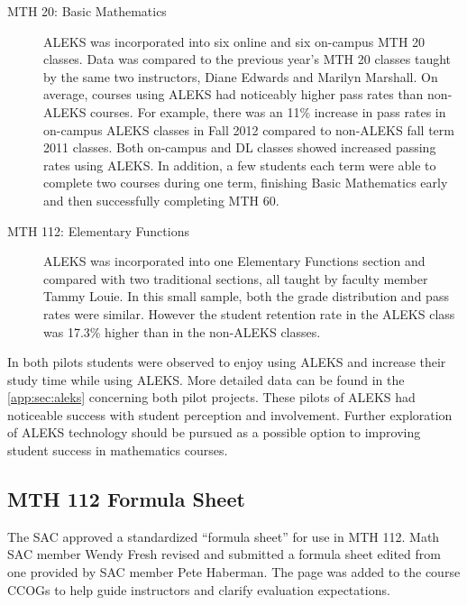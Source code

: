 \begin{description}
\item[MTH 20: Basic Mathematics] ALEKS was incorporated into six online and six
  on-campus MTH 20 classes.  Data was compared to the previous year's MTH 20
  classes taught by the same two instructors, Diane Edwards and Marilyn
  Marshall.  On average, courses using ALEKS had noticeably higher pass rates
  than non-ALEKS courses.  For example, there was an 11\% increase in pass rates
  in on-campus ALEKS classes in Fall 2012 compared to non-ALEKS fall term 2011
  classes.  Both on-campus and DL classes showed increased passing rates using
  ALEKS.  In addition, a few students each term were able to complete two
  courses during one term, finishing Basic Mathematics early and then
  successfully completing MTH 60.

\item[MTH 112: Elementary Functions] ALEKS was incorporated into one Elementary
  Functions section and compared with two traditional sections, all taught by
  faculty member Tammy Louie.  In this small sample, both the grade distribution
  and pass rates were similar.  However the student retention rate in the ALEKS
  class was 17.3\% higher than in the non-ALEKS classes.  
 
 \end{description}
 
In both pilots students were observed to enjoy using ALEKS and increase their
study time while using ALEKS.  More detailed data can be found in the
\vref{app:sec:aleks} concerning both pilot projects. These pilots of ALEKS had
noticeable success with student perception and involvement.  Further
exploration of ALEKS technology should be pursued as a possible option to
improving student success in mathematics courses.
 
\subsection{MTH 112 Formula Sheet}
The SAC approved a standardized ``formula sheet'' for use in MTH 112.  Math SAC
member Wendy Fresh revised and submitted a formula sheet edited from one
provided by SAC member Pete Haberman.  The page was added to the course CCOGs to
help guide instructors and clarify evaluation expectations.
 
